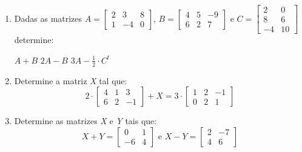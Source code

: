 \begin{multicols}{2}
  \begin{enumerate}[label*=\protect\fbox{\arabic{enumi}}]
    \item {
      Dadas as matrizes $A = \begin{bmatrix}
        2 & 3 & 8 \\
        1 & -4 & 0
      \end{bmatrix}$, $B = \begin{bmatrix}
        4 & 5 & -9 \\
        6 & 2 & 7
      \end{bmatrix}$ e $C = \begin{bmatrix}
        2 & 0 \\
        8 & 6 \\
        -4 & 10
      \end{bmatrix}$ determine:
      \begin{tasks}
        \task $A + B$
        \task $2A - B$
        \task $3A - \frac{1}{2}\cdot C^t$
      \end{tasks}
    }

    \item {
        Determine a matriz \textit{X} tal que:
        \begin{equation*}
          2 \cdot \begin{bmatrix}
            4 & 1 & 3 \\
            6 & 2 & -1
          \end{bmatrix} + X = 3 \cdot \begin{bmatrix}
            1 & 2 & -1 \\
            0 & 2 & 1
          \end{bmatrix}
        \end{equation*}
      }

    \item {
        Determine as matrizes \textit{X} e \textit{Y} tais que: 
        \begin{equation*}
          X + Y = \begin{bmatrix}
            0 & 1 \\
            -6 & 4
          \end{bmatrix} \text{ e } X - Y = \begin{bmatrix}
            2 & -7 \\
            4 & 6
          \end{bmatrix} 
        \end{equation*} 
      }
  \end{enumerate}
\end{multicols}

